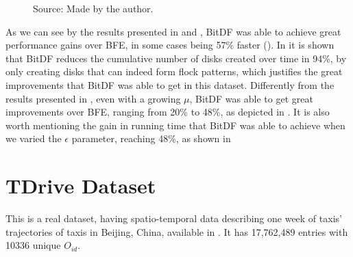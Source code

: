 {\begin{figure}[h!]
\begin{subfigure}[t]{0.48\textwidth}
        \label{fig:berlinmod_disks}
    \end{subfigure}
    \footnotesize{Source: Made by the author.}
    \label{fig:berlinmod_results2}
\end{figure}

As we can see by the results presented in  and , BitDF was
able to achieve great performance gains over BFE, in some cases being 57\% faster (). In
 it is shown that BitDF reduces the cumulative number of disks created over time in 94\%, by
only creating disks that can indeed form flock patterns, which justifies the great improvements that BitDF was able to
get in this dataset. Differently from the results presented in , even with a growing $\mu$, BitDF was
able to get great improvements over BFE, ranging from 20\% to 48\%, as depicted in . It is
also worth mentioning the gain in running time that BitDF was able to achieve when we varied the $\epsilon$ parameter,
reaching 48\%, as shown in 

\section{TDrive Dataset}
\label{sec:tdrive}
This is a real dataset, having spatio-temporal data describing one week of taxis' trajectories of taxis in Beijing,
China, available in \citep{tdrive}. It has 17,762,489 entries with 10336 unique $O_{id}$.

}
